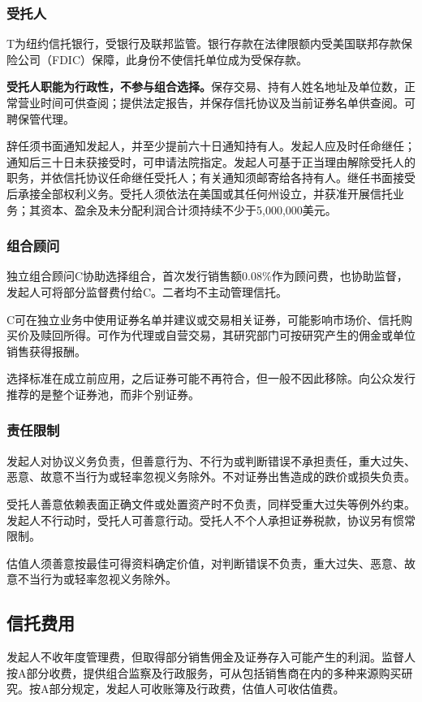 \documentclass[UTF8,fontset=none,11pt,a4paper]{ctexart}
\begin{document}
\subsubsection*{受托人}
T为纽约信托银行，受银行及联邦监管。银行存款在法律限额内受美国联邦存款保险公司（FDIC）保障，此身份不使信托单位成为受\allowbreak\mbox{保存款。}


\textbf{受托人职能为行政性，不参与组合选择。}保存交易、持有人姓名地址及单位数，正常营业时间可供查阅；提供法定报告，并保存信托协议及当前证券名单供查阅。可聘\allowbreak\mbox{保管代理。}


辞任须书面通知发起人，并至少提前六十日通知持有人。发起人应及时任命继任；通知后三十日未获接受时，可申请法院指定。发起人可基于正当理由解除受托人的职务，并依信托协议任命继任受托人；有关通知须邮寄给各持有人。继任书面接受后承接全部权利义务。受托人须依法在美国或其任何州设立，并获准开展信托业务；其资本、盈余及未分配利润合计须持续不少于\allowbreak\mbox{5,000,000美元。}


\subsubsection*{组合顾问}
独立组合顾问C协助选择组合，首次发行销售额0.08\%作为顾问费，也协助监督，发起人可将部分监督费付给C。二者均不主动\allowbreak\mbox{管理信托。}


C可在独立业务中使用证券名单并建议或交易相关证券，可能影响市场价、信托购买价及赎回所得。可作为代理或自营交易，其研究部门可按研究产生的佣金或单位销售\allowbreak\mbox{获得报酬。}


选择标准在成立前应用，之后证券可能不再符合，但一般不因此移除。向公众发行推荐的是整个证券池，而非\allowbreak\mbox{个别证券。}


\subsubsection*{责任限制}
发起人对协议义务负责，但善意行为、不行为或判断错误不承担责任，重大过失、恶意、故意不当行为或轻率忽视义务除外。不对证券出售造成的跌价或\allowbreak\mbox{损失负责。}


受托人善意依赖表面正确文件或处置资产时不负责，同样受重大过失等例外约束。发起人不行动时，受托人可善意行动。受托人不个人承担证券税款，协议另有\allowbreak\mbox{惯常限制。}


估值人须善意按最佳可得资料确定价值，对判断错误不负责，重大过失、恶意、故意不当行为或轻率忽视\allowbreak\mbox{义务除外。}


\subsection*{信托费用}
发起人不收年度管理费，但取得部分销售佣金及证券存入可能产生的利润。监督人按A部分收费，提供组合监察及行政服务，可从包括销售商在内的多种来源购买研究。按A部分规定，发起人可收账簿及行政费，估值人可\allowbreak\mbox{收估值费。}
\end{document}

